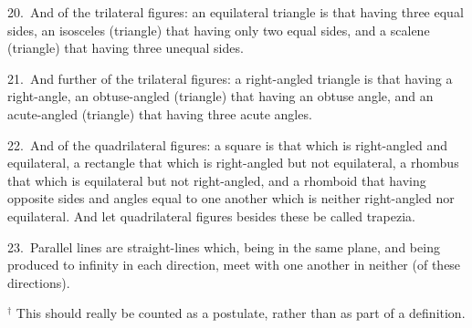 \begin{Parallel}{}{}
{20.~And of the trilateral figures: an equilateral triangle is that having
three equal sides, an isosceles (triangle) that having only two equal sides,
and a scalene (triangle) that having three unequal sides.

21.~And further of the trilateral figures: a right-angled triangle is that having
a right-angle, an obtuse-angled  (triangle) that having an obtuse
angle, and an acute-angled (triangle) that having three acute angles.

22.~And of the quadrilateral figures: a square is that which is right-angled
and equilateral, a rectangle that which is right-angled but not equilateral,
a rhombus that which is equilateral but not right-angled, and a rhomboid that
having opposite sides and angles equal to one another which is neither
right-angled nor equilateral. And let quadrilateral figures besides these be called
trapezia.

23.~Parallel lines are straight-lines which, being in the same plane, and
being produced to infinity in each direction, meet with one another in
neither (of these directions).}
\end{Parallel}
{\footnotesize 
\noindent $^\dag$ This should really be counted as a postulate, rather than as part of a definition.}

